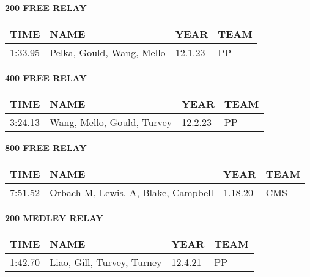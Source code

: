 \vspace{0.4cm}

\begin{center}
\begin{minipage}[t]{0.7\textwidth}
\centering
\textbf{200 FREE RELAY}\\[0.05cm]
\begin{tabular}{@{}p{1.8cm}p{2.8cm}p{1.2cm}p{1.4cm}@{}}
\hline
\textbf{TIME} & \textbf{NAME} & \textbf{YEAR} & \textbf{TEAM} \\
\hline
1:33.95 & Pelka, Gould, Wang, Mello & 12.1.23 & PP \\
\hline
\end{tabular}
\end{minipage}
\end{center}

\vspace{0.4cm}

\begin{center}
\begin{minipage}[t]{0.7\textwidth}
\centering
\textbf{400 FREE RELAY}\\[0.05cm]
\begin{tabular}{@{}p{1.8cm}p{2.8cm}p{1.2cm}p{1.4cm}@{}}
\hline
\textbf{TIME} & \textbf{NAME} & \textbf{YEAR} & \textbf{TEAM} \\
\hline
3:24.13 & Wang, Mello, Gould, Turvey & 12.2.23 & PP \\
\hline
\end{tabular}
\end{minipage}
\end{center}

\vspace{0.4cm}

\begin{center}
\begin{minipage}[t]{0.7\textwidth}
\centering
\textbf{800 FREE RELAY}\\[0.05cm]
\begin{tabular}{@{}p{1.8cm}p{2.8cm}p{1.2cm}p{1.4cm}@{}}
\hline
\textbf{TIME} & \textbf{NAME} & \textbf{YEAR} & \textbf{TEAM} \\
\hline
7:51.52 & Orbach-M, Lewis, A, Blake, Campbell & 1.18.20 & CMS \\
\hline
\end{tabular}
\end{minipage}
\end{center}

\vspace{0.4cm}

\begin{center}
\begin{minipage}[t]{0.7\textwidth}
\centering
\textbf{200 MEDLEY RELAY}\\[0.05cm]
\begin{tabular}{@{}p{1.8cm}p{2.8cm}p{1.2cm}p{1.4cm}@{}}
\hline
\textbf{TIME} & \textbf{NAME} & \textbf{YEAR} & \textbf{TEAM} \\
\hline
1:42.70 & Liao, Gill, Turvey, Turney & 12.4.21 & PP \\
\hline
\end{tabular}
\end{minipage}
\end{center}

